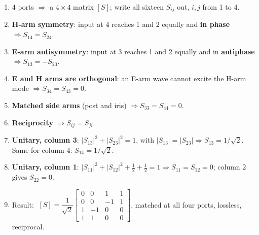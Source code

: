 \par{}
\begin{enumerate}[label=\arabic*., leftmargin=1.4em, itemsep=1pt]
  \item 4 ports $\Rightarrow$ a $4\times4$ matrix $[S]$; write all sixteen $S_{ij}$ out,
    $i, j$ from 1 to 4.
  \item \textbf{H-arm symmetry}: input at 4 reaches 1 and 2 equally and \textbf{in phase}
    $\Rightarrow S_{14} = S_{24}$.
  \item \textbf{E-arm antisymmetry}: input at 3 reaches 1 and 2 equally and in
    \textbf{antiphase} $\Rightarrow S_{13} = -S_{23}$.
  \item \textbf{E and H arms are orthogonal}: an E-arm wave cannot excite the H-arm mode
    $\Rightarrow S_{34} = S_{43} = 0$.
  \item \textbf{Matched side arms} (post and iris) $\Rightarrow S_{33} = S_{44} = 0$.
  \item \textbf{Reciprocity} $\Rightarrow S_{ij} = S_{ji}$.
  \item \textbf{Unitary, column 3}: $|S_{13}|^2 + |S_{23}|^2 = 1$, with
    $|S_{13}| = |S_{23}| \Rightarrow S_{13} = 1/\sqrt{2}$. Same for column 4:
    $S_{14} = 1/\sqrt{2}$.
  \item \textbf{Unitary, column 1}: $|S_{11}|^2 + |S_{12}|^2 + \tfrac{1}{2} + \tfrac{1}{2} = 1
    \Rightarrow S_{11} = S_{12} = 0$; column 2 gives $S_{22} = 0$.
  \item Result:
    $\;[S] = \dfrac{1}{\sqrt{2}}\left[\begin{smallmatrix} 0&0&1&1\\ 0&0&-1&1\\ 1&-1&0&0\\ 1&1&0&0 \end{smallmatrix}\right]$,
    matched at all four ports, lossless, reciprocal.
\end{enumerate}


